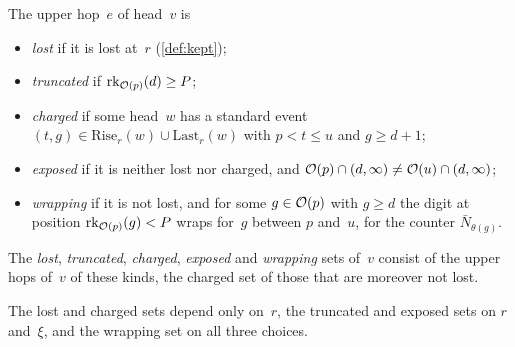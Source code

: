 \begin{definition}\label{def:hopsets}
The upper hop~$e$ of head~$v$ is
\begin{itemize}[leftmargin=1.5em]
\item \emph{lost} if it is lost at~$r$ (\cref{def:kept});
\item \emph{truncated} if $\operatorname{rk}_{\mathcal{O}(p)}(d)\ge P$;
\item \emph{charged} if some head~$w$ has a standard event $(t,g)\in\mathrm{Rise}_r(w)\cup\mathrm{Last}_r(w)$ with $p<t\le u$ and
$g\ge d+1$;
\item \emph{exposed} if it is neither lost nor charged, and $\mathcal{O}(p)\cap(d,\infty)\ne\mathcal{O}(u)\cap(d,\infty)$;
\item \emph{wrapping} if it is not lost, and for some $g\in\mathcal{O}(p)$ with $g\ge d$ the digit at position
$\operatorname{rk}_{\mathcal{O}(p)}(g)<P$ wraps for~$g$ between $p$ and~$u$, for the counter $\bar N_{\theta(g)}$.
\end{itemize}
The \emph{lost}, \emph{truncated}, \emph{charged}, \emph{exposed} and \emph{wrapping} sets of~$v$ consist of the upper hops of~$v$
of these kinds, the charged set of those that are moreover not lost.
\end{definition}

The lost and charged sets depend only on~$r$, the truncated and exposed sets on $r$ and~$\xi$, and the wrapping set on all three
choices.

